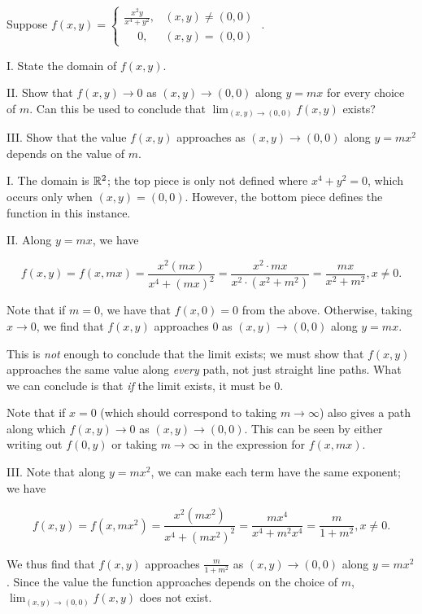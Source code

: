 \documentclass[noauthor, handout]{ximera}
\newcommand{\Lim}[2]{\lim_{#1 \to #2}}
\begin{document}

\begin{problem}
Suppose $f(x,y) =  \begin{cases} \frac{x^2y}{x^4+y^2} , & (x,y) \neq (0,0) \\[2 ex] \quad ~ 0, & (x,y)=(0,0) \end{cases} $ . 

I. State the domain of $f(x,y)$.

II. Show that $f(x,y) \to 0$ as $(x,y) \to (0,0)$ along $y=mx$ for every choice of $m$.  Can this be used to conclude that $\Lim{(x,y)}{(0,0)} f(x,y)$ exists?

III. Show that the value $f(x,y)$ approaches as $(x,y) \to (0,0)$ along $y=mx^2$ depends on the value of $m$.  

\begin{freeResponse}
I. The domain is $\mathbb R^2$; the top piece is only not defined where $x^4+y^2 =0$, which occurs only when $(x,y)=(0,0)$.  However, the bottom piece defines the function in this instance.

II. Along $y=mx$, we have

\[
f(x,y)=f(x,mx) = \frac{x^2(mx)}{x^4+(mx)^2} = \frac{x^2 \cdot mx}{x^2 \cdot (x^2+m^2)} = \frac{mx}{x^2+m^2} , x \neq 0.
\]

Note that if $m=0$, we have that $f(x,0) = 0$ from the above.  Otherwise, taking $x \to 0$, we find that $f(x,y)$ approaches $0$ as  $(x,y) \to (0,0)$ along $y=mx$.

This is \emph{not} enough to conclude that the limit exists; we must show that $f(x,y)$ approaches the same value along \emph{every} path, not just straight line paths.  What we can conclude is that \emph{if} the limit exists, it must be $0$.

\begin{remark}
Note that if $x=0$ (which should correspond to taking $m \to \infty$) also gives a path along which $f(x,y) \to 0$ as $(x,y) \to (0,0)$.  This can be seen by either writing out $f(0,y)$ or taking $m \to \infty$ in the expression for $f(x,mx)$.
\end{remark}

III. Note that along $y=mx^2$, we can make each term have the same exponent; we have

\[
f(x,y)=f(x,mx^2) = \frac{x^2(mx^2)}{x^4+(mx^2)^2} = \frac{mx^4}{x^4+m^2x^4} = \frac{m}{1+m^2} , x \neq 0.
\]

We thus find that $f(x,y)$ approaches $ \frac{m}{1+m^2}$ as  $(x,y) \to (0,0)$ along $y=mx^2$.  Since the value the function approaches depends on the choice of $m$, $\Lim{(x,y)}{(0,0)} f(x,y)$ does not exist.

\end{freeResponse}

\end{problem}
\end{document}
